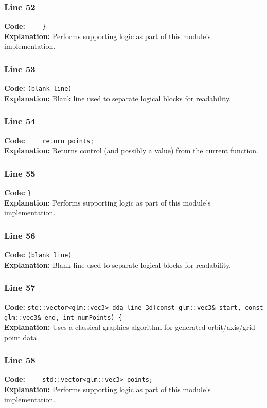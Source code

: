 \documentclass[11pt,a4paper]{article}
\begin{document}
\subsubsection*{Line 52}
\textbf{Code:} \verb|    }|\\
\textbf{Explanation:} Performs supporting logic as part of this module's implementation.

\subsubsection*{Line 53}
\textbf{Code:} \texttt{(blank line)}\\
\textbf{Explanation:} Blank line used to separate logical blocks for readability.

\subsubsection*{Line 54}
\textbf{Code:} \verb|    return points;|\\
\textbf{Explanation:} Returns control (and possibly a value) from the current function.

\subsubsection*{Line 55}
\textbf{Code:} \verb|}|\\
\textbf{Explanation:} Performs supporting logic as part of this module's implementation.

\subsubsection*{Line 56}
\textbf{Code:} \texttt{(blank line)}\\
\textbf{Explanation:} Blank line used to separate logical blocks for readability.

\subsubsection*{Line 57}
\textbf{Code:} \verb|std::vector<glm::vec3> dda_line_3d(const glm::vec3& start, const glm::vec3& end, int numPoints) {|\\
\textbf{Explanation:} Uses a classical graphics algorithm for generated orbit/axis/grid point data.

\subsubsection*{Line 58}
\textbf{Code:} \verb|    std::vector<glm::vec3> points;|\\
\textbf{Explanation:} Performs supporting logic as part of this module's implementation.
\end{document}
